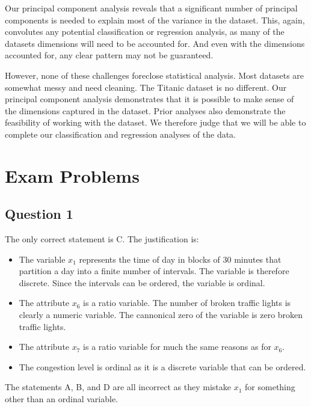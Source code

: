 \documentclass[twoside,11pt]{article}
\begin{document}
Our principal component analysis reveals that a significant number of principal components is needed to explain most of the variance in the dataset. This, again, convolutes any potential classification or regression analysis, as many of the datasets dimensions will need to be accounted for. And even with the dimensions accounted for, any clear pattern may not be guaranteed.

However, none of these challenges foreclose statistical analysis. Most datasets are somewhat messy and need cleaning. The Titanic dataset is no different. Our principal component analysis demonstrates that it is possible to make sense of the dimensions captured in the dataset. Prior analyses also demonstrate the feasibility of working with the dataset. We therefore judge that we will be able to complete our classification and regression analyses of the data.

\section*{Exam Problems}

\subsection*{Question 1}

The only correct statement is C. The justification is:

\begin{itemize}
	\item The variable \(x_1\) represents the time of day in blocks of 30 minutes that partition a day into a finite number of intervals. The variable is therefore discrete. Since the intervals can be ordered, the variable is ordinal.

	\item The attribute \(x_6\) is a ratio variable. The number of broken traffic lights is clearly a numeric variable. The cannonical zero of the variable is zero broken traffic lights.

	\item The attribute \(x_7\) is a ratio variable for much the same reasons as for \(x_6\).

	\item The congestion level is ordinal as it is a discrete variable that can be ordered.
\end{itemize}

The statements A, B, and D are all incorrect as they mistake \(x_1\) for something other than an ordinal variable.
\end{document}
